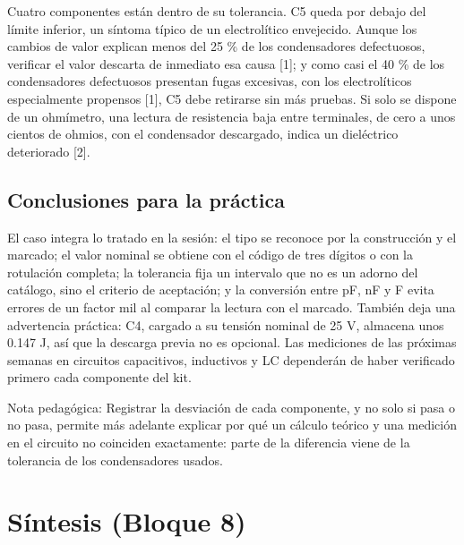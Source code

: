 \documentclass[11pt,letterpaper]{article}
\begin{document}
Cuatro componentes están dentro de su tolerancia. C5 queda por debajo del límite inferior, un síntoma típico de un electrolítico envejecido. Aunque los cambios de valor explican menos del 25 \% de los condensadores defectuosos, verificar el valor descarta de inmediato esa causa [1]; y como casi el 40 \% de los condensadores defectuosos presentan fugas excesivas, con los electrolíticos especialmente propensos [1], C5 debe retirarse sin más pruebas. Si solo se dispone de un ohmímetro, una lectura de resistencia baja entre terminales, de cero a unos cientos de ohmios, con el condensador descargado, indica un dieléctrico deteriorado [2].

\subsection{Conclusiones para la práctica}

El caso integra lo tratado en la sesión: el tipo se reconoce por la construcción y el marcado; el valor nominal se obtiene con el código de tres dígitos o con la rotulación completa; la tolerancia fija un intervalo que no es un adorno del catálogo, sino el criterio de aceptación; y la conversión entre pF, nF y \textmu{}F evita errores de un factor mil al comparar la lectura con el marcado. También deja una advertencia práctica: C4, cargado a su tensión nominal de 25 V, almacena unos 0.147 J, así que la descarga previa no es opcional. Las mediciones de las próximas semanas en circuitos capacitivos, inductivos y LC dependerán de haber verificado primero cada componente del kit.

\begin{nota}{Nota pedagógica:}
Registrar la desviación de cada componente, y no solo si pasa o no pasa, permite más adelante explicar por qué un cálculo teórico y una medición en el circuito no coinciden exactamente: parte de la diferencia viene de la tolerancia de los condensadores usados.
\end{nota}

\section{Síntesis (Bloque 8)}
\end{document}
